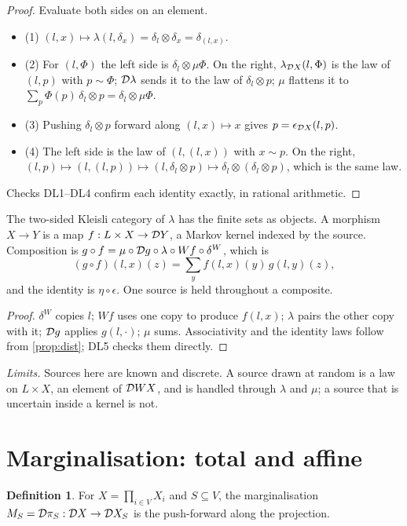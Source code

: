 \documentclass[11pt]{article}
\theoremstyle{definition}\newtheorem{definition}[theorem]{Definition}\newtheorem{remark}[theorem]{Remark}\newtheorem{example}[theorem]{Example}
\begin{document}
\begin{proof}
Evaluate both sides on an element.
\begin{itemize}
\item (1) $(l,x)\mapsto\lambda(l,\delta_x)=\delta_l\otimes\delta_x=\delta_{(l,x)}$.
\item (2) For $(l,\Phi)$ the left side is $\delta_l\otimes\mu\Phi$. On the right, $\lambda_{\mathcal D X}(l,\Phi)$ is the law of $(l,p)$ with
  $p\sim\Phi$; $\mathcal D\lambda$ sends it to the law of $\delta_l\otimes p$; $\mu$ flattens it to $\sum_p\Phi(p)\,\delta_l\otimes p=\delta_l\otimes\mu\Phi$.
\item (3) Pushing $\delta_l\otimes p$ forward along $(l,x)\mapsto x$ gives $p=\epsilon_{\mathcal D X}(l,p)$.
\item (4) The left side is the law of $(l,(l,x))$ with $x\sim p$. On the right, $(l,p)\mapsto(l,(l,p))\mapsto(l,\delta_l\otimes p)\mapsto
  \delta_l\otimes(\delta_l\otimes p)$, which is the same law.
\end{itemize}
Checks DL1--DL4 confirm each identity exactly, in rational arithmetic.
\end{proof}

\begin{proposition}\label{prop:bikleisli}
The two-sided Kleisli category of $\lambda$ \cite{BrookesVanStone1993,PowerWatanabe2002} has the finite sets as objects. A morphism $X\to Y$
is a map $f:L\times X\to\mathcal D Y$, a Markov kernel indexed by the source. Composition is $g\circ f=\mu\circ\mathcal D g\circ\lambda\circ Wf\circ\delta^W$, which is
\[
(g\circ f)(l,x)(z)=\sum_yf(l,x)(y)\,g(l,y)(z) ,
\]
and the identity is $\eta\circ\epsilon$. One source is held throughout a composite.
\end{proposition}

\begin{proof}
$\delta^W$ copies $l$; $Wf$ uses one copy to produce $f(l,x)$; $\lambda$ pairs the other copy with it; $\mathcal D g$ applies $g(l,\cdot)$; $\mu$ sums.
Associativity and the identity laws follow from \cref{prop:dist}; DL5 checks them directly.
\end{proof}

\emph{Limits.} Sources here are known and discrete. A source drawn at random is a law on $L\times X$, an element of $\mathcal D WX$, and is
handled through $\lambda$ and $\mu$; a source that is uncertain inside a kernel is not.

\section{Marginalisation: total and affine}\label{sec:marg}
\begin{definition}\label{def:marg}
For $X=\prod_{i\in V}X_i$ and $S\subseteq V$, the marginalisation $M_S=\mathcal D\pi_S:\mathcal D X\to\mathcal D X_S$ is the push-forward along the projection.
\end{definition}
\end{document}
